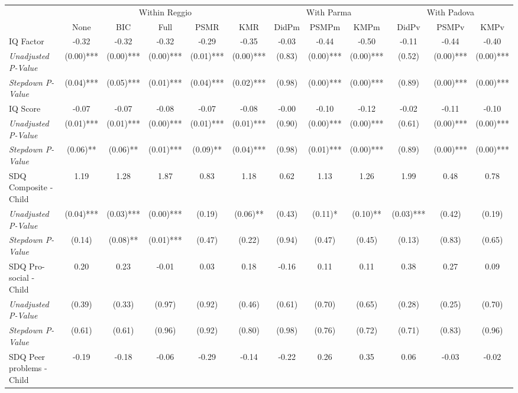 \begin{tabular}{l c c c c c c c c c c c}
\toprule
& \multicolumn{5}{c}{Within Reggio} & \multicolumn{3}{c}{With Parma} & \multicolumn{3}{c}{With Padova} \\\cmidrule(lr){2-6} \cmidrule(lr){7-9} \cmidrule(lr){10-12}
 & None & BIC & Full & PSMR & KMR & DidPm & PSMPm & KMPm & DidPv & PSMPv & KMPv \\
\midrule
IQ Factor & -0.32 & -0.32 & -0.32 & -0.29 & -0.35 & -0.03 & -0.44 & -0.50 & -0.11 & -0.44 & -0.40 \\
\quad \textit{Unadjusted P-Value} & (0.00)*** & (0.00)*** & (0.00)*** & (0.01)*** & (0.00)*** & (0.83) & (0.00)*** & (0.00)*** & (0.52) & (0.00)*** & (0.00)*** \\
\quad \textit{Stepdown P-Value} & (0.04)*** & (0.05)*** & (0.01)*** & (0.04)*** & (0.02)*** & (0.98) & (0.00)*** & (0.00)*** & (0.89) & (0.00)*** & (0.00)*** \\
IQ Score & -0.07 & -0.07 & -0.08 & -0.07 & -0.08 & -0.00 & -0.10 & -0.12 & -0.02 & -0.11 & -0.10 \\
\quad \textit{Unadjusted P-Value} & (0.01)*** & (0.01)*** & (0.00)*** & (0.01)*** & (0.01)*** & (0.90) & (0.00)*** & (0.00)*** & (0.61) & (0.00)*** & (0.00)*** \\
\quad \textit{Stepdown P-Value} & (0.06)** & (0.06)** & (0.01)*** & (0.09)** & (0.04)*** & (0.98) & (0.01)*** & (0.00)*** & (0.89) & (0.00)*** & (0.00)*** \\
SDQ Composite - Child & 1.19 & 1.28 & 1.87 & 0.83 & 1.18 & 0.62 & 1.13 & 1.26 & 1.99 & 0.48 & 0.78 \\
\quad \textit{Unadjusted P-Value} & (0.04)*** & (0.03)*** & (0.00)*** & (0.19) & (0.06)** & (0.43) & (0.11)* & (0.10)** & (0.03)*** & (0.42) & (0.19) \\
\quad \textit{Stepdown P-Value} & (0.14) & (0.08)** & (0.01)*** & (0.47) & (0.22) & (0.94) & (0.47) & (0.45) & (0.13) & (0.83) & (0.65) \\
SDQ Pro-social - Child & 0.20 & 0.23 & -0.01 & 0.03 & 0.18 & -0.16 & 0.11 & 0.11 & 0.38 & 0.27 & 0.09 \\
\quad \textit{Unadjusted P-Value} & (0.39) & (0.33) & (0.97) & (0.92) & (0.46) & (0.61) & (0.70) & (0.65) & (0.28) & (0.25) & (0.70) \\
\quad \textit{Stepdown P-Value} & (0.61) & (0.61) & (0.96) & (0.92) & (0.80) & (0.98) & (0.76) & (0.72) & (0.71) & (0.83) & (0.96) \\
SDQ Peer problems - Child & -0.19 & -0.18 & -0.06 & -0.29 & -0.14 & -0.22 & 0.26 & 0.35 & 0.06 & -0.03 & -0.02 \\

\end{tabular}
